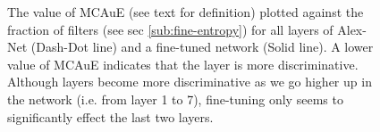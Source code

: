 \begin{figure}[t!]
\centering
{}
\caption{The value of MCAuE (see text for definition) plotted against the fraction of filters (see sec \ref{sub:fine-entropy}) for all layers of Alex-Net (Dash-Dot line) and a fine-tuned network (Solid line). A lower value of MCAuE indicates that the layer is more discriminative. Although layers become more discriminative as we go higher up in the network (i.e. from layer 1 to 7), fine-tuning only seems to significantly effect the last two layers.}
\label{fig:fine-entropy}
\end{figure}

